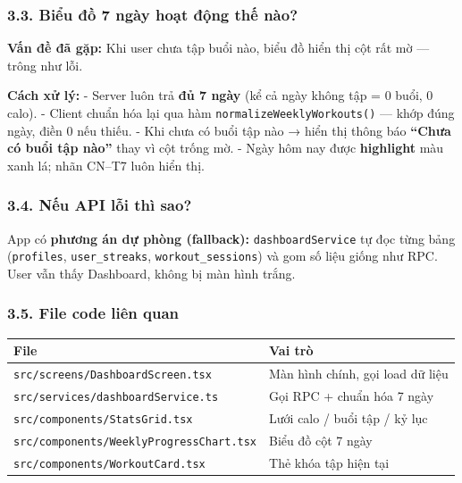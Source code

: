 \documentclass[12pt,a4paper]{article}
\newcounter{none}
\begin{document}
\subsubsection{3.3. Biểu đồ 7 ngày hoạt động thế
nào?}\label{biux1ec3u-ux111ux1ed3-7-nguxe0y-houx1ea1t-ux111ux1ed9ng-thux1ebf-nuxe0o}

\textbf{Vấn đề đã gặp:} Khi user chưa tập buổi nào, biểu đồ hiển thị cột
rất mờ --- trông như lỗi.

\textbf{Cách xử lý:} - Server luôn trả \textbf{đủ 7 ngày} (kể cả ngày
không tập = 0 buổi, 0 calo). - Client chuẩn hóa lại qua hàm
\texttt{normalizeWeeklyWorkouts()} --- khớp đúng ngày, điền 0 nếu thiếu.
- Khi chưa có buổi tập nào → hiển thị thông báo \textbf{``Chưa có buổi
tập nào''} thay vì cột trống mờ. - Ngày hôm nay được \textbf{highlight}
màu xanh lá; nhãn CN--T7 luôn hiển thị.

\subsubsection{3.4. Nếu API lỗi thì
sao?}\label{nux1ebfu-api-lux1ed7i-thuxec-sao}

App có \textbf{phương án dự phòng (fallback):} \texttt{dashboardService}
tự đọc từng bảng (\texttt{profiles}, \texttt{user\_streaks},
\texttt{workout\_sessions}) và gom số liệu giống như RPC. User vẫn thấy
Dashboard, không bị màn hình trắng.

\subsubsection{3.5. File code liên quan}\label{file-code-liuxean-quan}

{\def\LTcaptype{none} %
\begin{longtable}[]{@{}ll@{}}
\toprule\noalign{}
File & Vai trò \\
\midrule\noalign{}
\endhead
\bottomrule\noalign{}
\endlastfoot
\texttt{src/screens/DashboardScreen.tsx} & Màn hình chính, gọi load dữ
liệu \\
\texttt{src/services/dashboardService.ts} & Gọi RPC + chuẩn hóa 7
ngày \\
\texttt{src/components/StatsGrid.tsx} & Lưới calo / buổi tập / kỷ lục \\
\texttt{src/components/WeeklyProgressChart.tsx} & Biểu đồ cột 7 ngày \\
\texttt{src/components/WorkoutCard.tsx} & Thẻ khóa tập hiện tại \\
\end{longtable}
}
\end{document}
